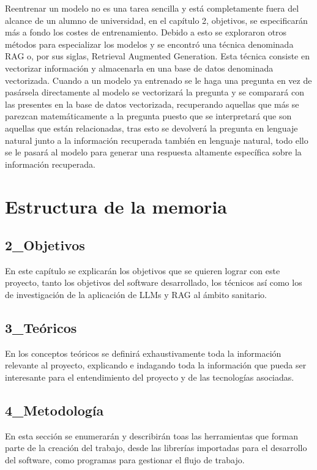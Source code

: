 Reentrenar un modelo no es una tarea sencilla y está completamente fuera del alcance de un alumno de universidad, en el capítulo 2, objetivos, se especificarán más a fondo los costes de entrenamiento. Debido a esto se exploraron otros métodos para especializar los modelos y se encontró una técnica denominada RAG o, por sus siglas, Retrieval Augmented Generation. Esta técnica consiste en vectorizar información y almacenarla en una base de datos denominada vectorizada. Cuando a un modelo ya entrenado se le haga una pregunta en vez de pasársela directamente al modelo se vectorizará la pregunta y se comparará con las presentes en la base de datos vectorizada, recuperando aquellas que más se parezcan matemáticamente a la pregunta puesto que se interpretará que son aquellas que están relacionadas, tras esto se devolverá la pregunta en lenguaje natural junto a la información recuperada también en lenguaje natural, todo ello se le pasará al modelo para generar una respuesta altamente específica sobre la información recuperada.


\section{Estructura de la memoria}

\subsection{2\_Objetivos}

En este capítulo se explicarán los objetivos que se quieren lograr con este proyecto, tanto los objetivos del software desarrollado, los técnicos así como los de investigación de la aplicación de LLMs y RAG al ámbito sanitario.

\subsection{3\_Teóricos}

En los conceptos teóricos se definirá exhaustivamente toda la información relevante al proyecto, explicando e indagando toda la información que pueda ser interesante para el entendimiento del proyecto y de las tecnologías asociadas.

\subsection{4\_Metodología}

En esta sección se enumerarán y describirán toas las herramientas que forman parte de la creación del trabajo, desde las librerías importadas para el desarrollo del software, como programas para gestionar el flujo de trabajo.

